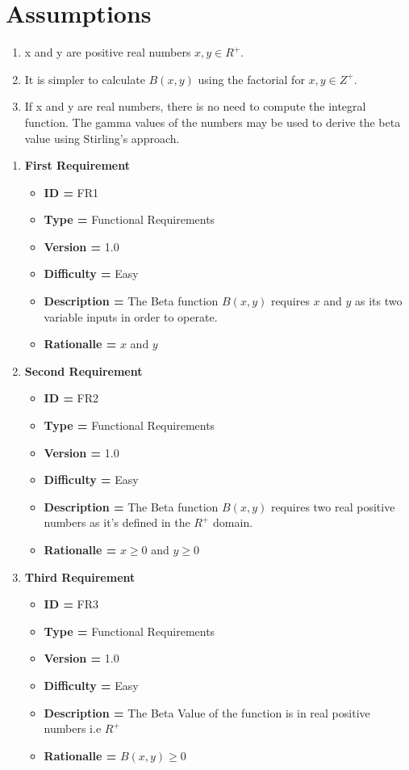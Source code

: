 \documentclass[12pt,a4paper]{report}
\begin{document}
\section*{Assumptions}
    \begin{enumerate}[noitemsep]
        \item x and y are positive real numbers $x,y \in R^{+}$.
        \item It is simpler to calculate $B(x,y)$ using the factorial for $x,y \in Z^{+}$.
        \item If x and y are real numbers, there is no need to compute the integral function. The gamma values of the numbers may be used to derive the beta value using Stirling's approach.
    \end{enumerate}
\begin{enumerate}[noitemsep]
        \item \textbf{First Requirement}
        \begin{itemize}[noitemsep]
            \item \textbf{ID = } FR1
            \item\textbf{Type = } Functional Requirements
            \item\textbf{Version = } 1.0
            \item\textbf{Difficulty = } Easy
            \item\textbf{Description = } The Beta function $B(x,y)$ requires $x$ and $y$ as its two variable inputs in order to operate.
            \item\textbf{Rationalle = } $x$ and $y$ 
        \end{itemize}
        \item \textbf{Second Requirement}
        \begin{itemize}
            \item \textbf{ID = } FR2
            \item\textbf{Type = } Functional Requirements
            \item\textbf{Version = } 1.0
            \item\textbf{Difficulty = } Easy
            \item\textbf{Description = } The Beta function $B(x,y)$ requires two real positive numbers as it's defined in the $R^{+}$ domain.
            \item\textbf{Rationalle = } $x \geq 0$ and $y \geq 0$ 
        \end{itemize}
        \item \textbf{Third Requirement}
        \begin{itemize}
            \item \textbf{ID = } FR3
            \item\textbf{Type = } Functional Requirements
            \item\textbf{Version = } 1.0
            \item\textbf{Difficulty = } Easy
            \item\textbf{Description = } The Beta Value of the function is in real positive numbers i.e $R^{+}$
            \item\textbf{Rationalle = } $B(x,y) \geq 0$ 
        \end{itemize}
        

\end{enumerate}
\end{document}
